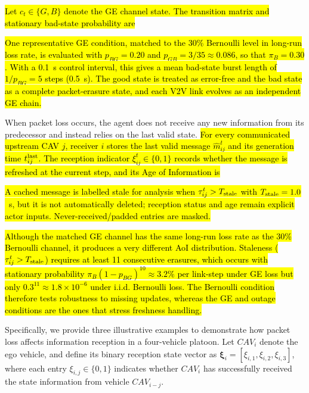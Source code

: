 \documentclass{ieeeaccess}
\newcommand{\eqrevbox}[1]{\begingroup\setlength{\fboxsep}{1pt}\colorbox{yellow}{#1}\endgroup}
\begin{document}
\hl{Let $c_t\in\{G,B\}$ denote the GE channel state. The transition matrix and stationary bad-state probability are}
\hl{One representative GE condition, matched to the 30\% Bernoulli level in long-run loss rate, is evaluated with $p_{BG}=0.20$ and $p_{GB}=3/35\approx0.086$, so that $\pi_B=0.30$. With a 0.1~s control interval, this gives a mean bad-state burst length of $1/p_{BG}=5$ steps (0.5~s). The good state is treated as error-free and the bad state as a complete packet-erasure state, and each V2V link evolves as an independent GE chain.} %


When packet loss occurs, the agent does not receive any new information from its predecessor and instead relies on the last valid state. \hl{For every communicated upstream CAV $j$, receiver $i$ stores the last valid message $\hat m_{ij}^{t}$ and its generation time $t_{ij}^{\rm last}$. The reception indicator $\xi_{ij}^{t}\in\{0,1\}$ records whether the message is refreshed at the current step, and its Age of Information is}
\hl{A cached message is labelled stale for analysis when $\tau_{ij}^{t}>T_{\rm stale}$ with $T_{\rm stale}=1.0$~s, but it is not automatically deleted; reception status and age remain explicit actor inputs. Never-received/padded entries are masked.} %

\hl{Although the matched GE channel has the same long-run loss rate as the 30\% Bernoulli channel, it produces a very different AoI distribution. Staleness ($\tau_{ij}^{t}>T_{\rm stale}$) requires at least 11 consecutive erasures, which occurs with stationary probability $\pi_B(1-p_{BG})^{10}\approx3.2\%$ per link-step under GE loss but only $0.3^{11}\approx1.8\times10^{-6}$ under i.i.d. Bernoulli loss. The Bernoulli condition therefore tests robustness to missing updates, whereas the GE and outage conditions are the ones that stress freshness handling.} %

Specifically, we provide three illustrative examples to demonstrate how packet loss affects information reception in a four-vehicle platoon. Let \( CAV_i \) denote the ego vehicle, and define its binary reception state vector as \( \boldsymbol{\xi}_i = [\xi_{i,1}, \xi_{i,2}, \xi_{i,3}] \), where each entry \( \xi_{i,j} \in \{0,1\} \) indicates whether \( CAV_i \) has successfully received the state information from vehicle \( CAV_{i-j} \).
\end{document}

